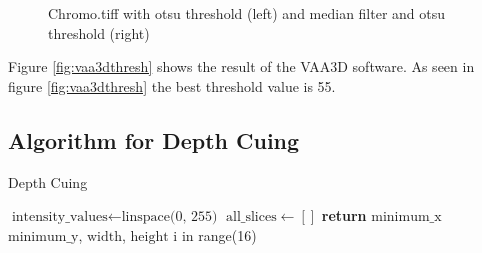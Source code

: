 \documentclass{article}
\begin{document}
\begin{figure}%
    \centering
     \label{fig:Otsu}%
    \qquad
    \caption{Chromo.tiff with otsu threshold (left) and median filter and otsu threshold (right)}%
    \label{fig:otsu-median}%
\end{figure}

Figure \ref{fig:vaa3dthresh} shows the result of the VAA3D software. As seen in figure \ref{fig:vaa3dthresh} the best threshold value is 55. 

\subsection*{Algorithm for Depth Cuing}

\begin{algorithm}[h!]
\caption{Depth Cuing}\label{algo:depth-cuing}
\begin{algorithmic}[1]
    \State $\text{intensity_values} \gets \text{linspace(0, 255)}$
    \State $\text{all_slices} \gets []$
    \State \textbf{return} $\text{minimum\_x}$
    $\text{minimum\_y}$, $\text{width}$, $\text{height}$ 
    \For i in range(16)
\EndProcedure
\end{algorithmic}
\end{algorithm}
\end{document}
